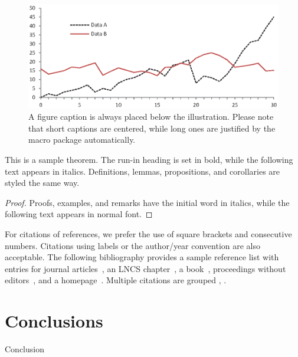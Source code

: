 \documentclass[runningheads]{llncs}
\begin{document}
\begin{figure}
\includegraphics[width=\textwidth]{fig1.eps}
\caption{A figure caption is always placed below the illustration.
Please note that short captions are centered, while long ones are
justified by the macro package automatically.} \label{fig1}
\end{figure}

\begin{theorem}
This is a sample theorem. The run-in heading is set in bold, while
the following text appears in italics. Definitions, lemmas,
propositions, and corollaries are styled the same way.
\end{theorem}
%
%
\begin{proof}
Proofs, examples, and remarks have the initial word in italics,
while the following text appears in normal font.
\end{proof}
For citations of references, we prefer the use of square brackets
and consecutive numbers. Citations using labels or the author/year
convention are also acceptable. The following bibliography provides
a sample reference list with entries for journal
articles~\cite{ref_article1}, an LNCS chapter~\cite{ref_lncs1}, a
book~\cite{ref_book1}, proceedings without editors~\cite{ref_proc1},
and a homepage~\cite{ref_url1}. Multiple citations are grouped
\cite{ref_article1,ref_lncs1,ref_book1},
\cite{ref_article1,ref_book1,ref_proc1,ref_url1}.
\section{Conclusions}
Conclusion
%
%
%


%
\end{document}

